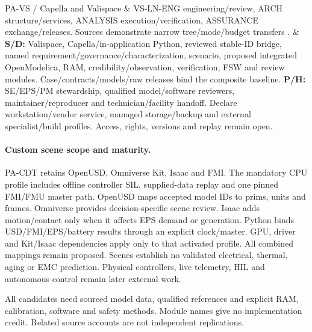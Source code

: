 {\begin{longtable}
PA-VS / Capella and Valispace & VS-LN-ENG engineering/review, ARCH structure/services, ANALYSIS execution/verification, ASSURANCE exchange/releases. Sources demonstrate narrow tree/mode/budget transfers \citep[Secs.~3.1 and~4.3--4.4]{campioli2025integration}. & \textbf{S/D:} Valispace, Capella/in-application Python, reviewed stable-ID bridge, named requirement/governance/characterization, scenario, proposed integrated OpenModelica, RAM, credibility/observation, verification, FSW and review modules. Case/contracts/models/raw releases bind the composite baseline. \textbf{P/H:} SE/EPS/PM stewardship, qualified model/software reviewers, maintainer/reproducer and technician/facility handoff. Declare workstation/vendor service, managed storage/backup and external specialist/build profiles. Access, rights, versions and replay remain open. \\
\end{longtable}
}

\paragraph{Custom scene scope and maturity.}
PA-CDT retains OpenUSD, Omniverse Kit, Isaac and FMI. The mandatory CPU profile includes offline controller SIL, supplied-data replay and one pinned FMI/FMU master path. OpenUSD maps accepted model IDs to prims, units and frames. Omniverse provides decision-specific scene review. Isaac adds motion/contact only when it affects EPS demand or generation. Python binds USD/FMI/EPS/battery results through an explicit clock/master. GPU, driver and Kit/Isaac dependencies apply only to that activated profile. All combined mappings remain proposed. Scenes establish no validated electrical, thermal, aging or EMC prediction. Physical controllers, live telemetry, HIL and autonomous control remain later external work.

All candidates need sourced model data, qualified references and explicit RAM, calibration, software and safety methods. Module names give no implementation credit. Related source accounts are not independent replications.
